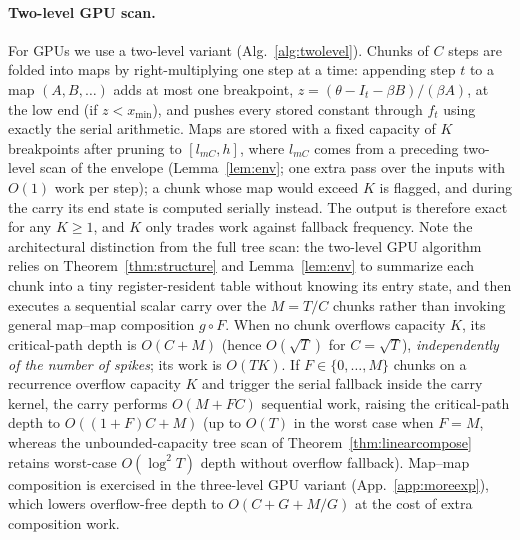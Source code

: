\documentclass[10pt]{article}
\newcounter{algo}
\theoremstyle{remark}
\begin{document}
\paragraph{Two-level GPU scan.}
For GPUs we use a two-level variant (Alg.~\ref{alg:twolevel}). Chunks of $C$ steps are folded into maps by right-multiplying one step at a time: appending step $t$ to a map $(A,B,\ldots)$ adds at most one breakpoint, $z=(\theta-I_t-\beta B)/(\beta A)$, at the low end (if $z<x_{\min}$), and pushes every stored constant through $f_t$ using exactly the serial arithmetic. Maps are stored with a fixed capacity of $K$ breakpoints after pruning to $[l_{mC},h]$, where $l_{mC}$ comes from a preceding two-level scan of the envelope (Lemma~\ref{lem:env}; one extra pass over the inputs with $O(1)$ work per step); a chunk whose map would exceed $K$ is flagged, and during the carry its end state is computed serially instead. The output is therefore exact for any $K\ge1$, and $K$ only trades work against fallback frequency. Note the architectural distinction from the full tree scan: the two-level GPU algorithm relies on Theorem~\ref{thm:structure} and Lemma~\ref{lem:env} to summarize each chunk into a tiny register-resident table without knowing its entry state, and then executes a sequential scalar carry over the $M=T/C$ chunks rather than invoking general map--map composition $g\circ F$. When no chunk overflows capacity $K$, its critical-path depth is $O(C+M)$ (hence $O(\sqrt T)$ for $C=\sqrt T$), \emph{independently of the number of spikes}; its work is $O(TK)$. If $F\in\{0,\dots,M\}$ chunks on a recurrence overflow capacity $K$ and trigger the serial fallback inside the carry kernel, the carry performs $O(M+FC)$ sequential work, raising the critical-path depth to $O((1+F)C+M)$ (up to $O(T)$ in the worst case when $F=M$, whereas the unbounded-capacity tree scan of Theorem~\ref{thm:linearcompose} retains worst-case $O(\log^2 T)$ depth without overflow fallback). Map--map composition is exercised in the three-level GPU variant (App.~\ref{app:moreexp}), which lowers overflow-free depth to $O(C+G+M/G)$ at the cost of extra composition work.
\end{document}
